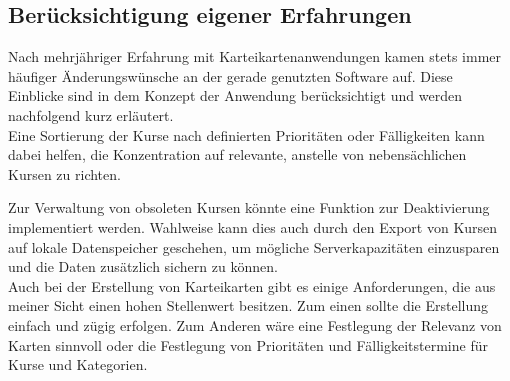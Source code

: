 





\subsection{Berücksichtigung eigener Erfahrungen}
Nach mehrjähriger Erfahrung mit Karteikartenanwendungen kamen stets immer häufiger Änderungswünsche an der gerade genutzten Software auf. Diese Einblicke sind in dem Konzept der Anwendung berücksichtigt und werden nachfolgend kurz erläutert. \\

Eine Sortierung der Kurse nach definierten Prioritäten oder Fälligkeiten kann dabei helfen, die Konzentration auf relevante, anstelle von nebensächlichen Kursen zu richten.

Zur Verwaltung von obsoleten Kursen könnte eine Funktion zur Deaktivierung implementiert werden. Wahlweise kann dies auch durch den Export von Kursen auf lokale Datenspeicher geschehen, um mögliche Serverkapazitäten einzusparen und die Daten zusätzlich sichern zu können. \\

Auch bei der Erstellung von Karteikarten gibt es einige Anforderungen, die aus meiner Sicht einen hohen Stellenwert besitzen. Zum einen sollte die Erstellung einfach und zügig erfolgen. Zum Anderen wäre eine Festlegung der Relevanz von Karten sinnvoll oder die Festlegung von Prioritäten und Fälligkeitstermine für Kurse und Kategorien. 

